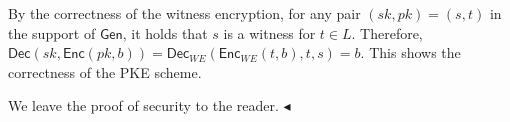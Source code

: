 \documentclass[10pt,a4paper]{article}
\begin{document}
By the correctness of the witness encryption, for any pair $(sk,pk)=(s,t)$ in the support of ${\mathsf{Gen}}$, it holds that $s$ is a witness for $t\in L$. Therefore, ${\mathsf{Dec}}(sk,{\mathsf{Enc}}(pk,b))={\mathsf{Dec}}_{WE}({\mathsf{Enc}}_{WE}(t,b),t,s)=b$. This shows the correctness of the PKE scheme.\par




We leave the proof of security to the reader.
$\blacktriangleleft$
\par
\end{document}

